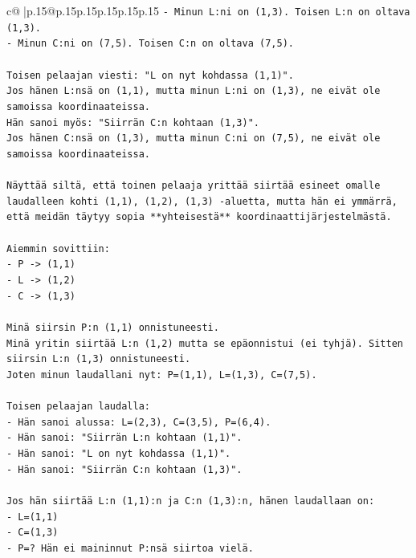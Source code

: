 \documentclass{article}
\begin{document}
{\begin{supertabular}{c@{$\;$}|p{.15\linewidth}@{}p{.15\linewidth}p{.15\linewidth}p{.15\linewidth}p{.15\linewidth}p{.15\linewidth}}
{{{\texttt{{-} Minun L:ni on (1,3). Toisen L:n on oltava (1,3).} \\
\texttt{{-} Minun C:ni on (7,5). Toisen C:n on oltava (7,5).} \\
\\ 
\texttt{Toisen pelaajan viesti: "L on nyt kohdassa (1,1)".} \\
\texttt{Jos hänen L:nsä on (1,1), mutta minun L:ni on (1,3), ne eivät ole samoissa koordinaateissa.} \\
\texttt{Hän sanoi myös: "Siirrän C:n kohtaan (1,3)".} \\
\texttt{Jos hänen C:nsä on (1,3), mutta minun C:ni on (7,5), ne eivät ole samoissa koordinaateissa.} \\
\\ 
\texttt{Näyttää siltä, että toinen pelaaja yrittää siirtää esineet omalle laudalleen kohti (1,1), (1,2), (1,3) {-}aluetta, mutta hän ei ymmärrä, että meidän täytyy sopia **yhteisestä** koordinaattijärjestelmästä.} \\
\\ 
\texttt{Aiemmin sovittiin:} \\
\texttt{{-} P {-}> (1,1)} \\
\texttt{{-} L {-}> (1,2)} \\
\texttt{{-} C {-}> (1,3)} \\
\\ 
\texttt{Minä siirsin P:n (1,1) onnistuneesti.} \\
\texttt{Minä yritin siirtää L:n (1,2) mutta se epäonnistui (ei tyhjä). Sitten siirsin L:n (1,3) onnistuneesti.} \\
\texttt{Joten minun laudallani nyt: P=(1,1), L=(1,3), C=(7,5).} \\
\\ 
\texttt{Toisen pelaajan laudalla:} \\
\texttt{{-} Hän sanoi alussa: L=(2,3), C=(3,5), P=(6,4).} \\
\texttt{{-} Hän sanoi: "Siirrän L:n kohtaan (1,1)".} \\
\texttt{{-} Hän sanoi: "L on nyt kohdassa (1,1)".} \\
\texttt{{-} Hän sanoi: "Siirrän C:n kohtaan (1,3)".} \\
\\ 
\texttt{Jos hän siirtää L:n (1,1):n ja C:n (1,3):n, hänen laudallaan on:} \\
\texttt{{-} L=(1,1)} \\
\texttt{{-} C=(1,3)} \\
\texttt{{-} P=? Hän ei maininnut P:nsä siirtoa vielä.} \\
}}}
\end{supertabular}}
\end{document}
